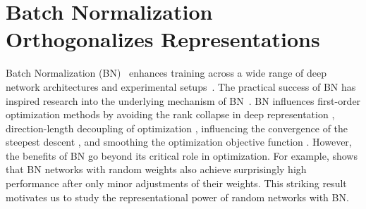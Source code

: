 

\chapter{Batch Normalization Orthogonalizes Representations}\label{ch:bn_ortho}

Batch Normalization (BN)~\citep{ioffe2015batch} enhances training across a wide range of deep network architectures and experimental setups~\citep{he2016deep,huang2017densely,silver2017mastering}. The practical success of BN has inspired research into the underlying mechanism of BN~\citep{santurkar2018does,karakida2019normalization,arora2018theoretical,bjorck2018understanding}.
BN influences first-order optimization methods by avoiding the rank collapse in deep representation \citep{daneshmand2020batch},  direction-length decoupling of optimization \citep{kohler2018exponential}, influencing the convergence of the steepest descent  \citep{arora2018theoretical,bjorck2018understanding}, and smoothing the optimization objective function \citep{santurkar2018does,karakida2019normalization}. However, the benefits of BN go beyond its critical role in optimization. For example, \cite{frankle2020training} shows that BN networks with random weights also achieve surprisingly high performance after only minor adjustments of their weights. This striking result motivates us to study the representational power of random networks with BN.  


